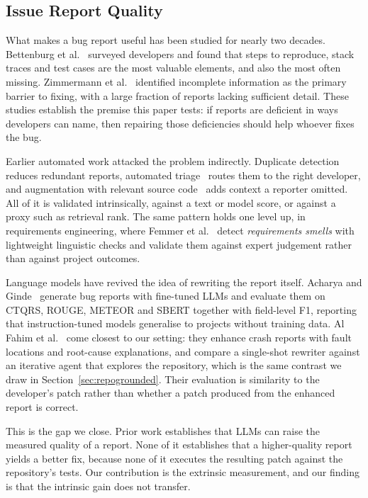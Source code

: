 \documentclass[journal]{IEEEtran}
\begin{document}
\subsection{Issue Report Quality}

What makes a bug report useful has been studied for nearly two decades. Bettenburg et
al.~\cite{bettenburg2008what} surveyed developers and found that steps to reproduce, stack
traces and test cases are the most valuable elements, and also the most often missing.
Zimmermann et al.~\cite{zimmermann2010what} identified incomplete information as the primary
barrier to fixing, with a large fraction of reports lacking sufficient detail. These studies
establish the premise this paper tests: if reports are deficient in ways developers can name,
then repairing those deficiencies should help whoever fixes the bug.

Earlier automated work attacked the problem indirectly. Duplicate detection~\cite{sun2011towards,
lazar2014generating} reduces redundant reports, automated triage~\cite{anvik2006should,
murphy2004automatic} routes them to the right developer, and augmentation with relevant source
code~\cite{wong2014autolocate, moreno2015arena} adds context a reporter omitted. All of it is
validated intrinsically, against a text or model score, or against a proxy such as retrieval
rank. The same pattern holds one level up, in requirements engineering, where Femmer et
al.~\cite{femmer2016smells} detect \emph{requirements smells} with lightweight linguistic
checks and validate them against expert judgement rather than against project outcomes.

Language models have revived the idea of rewriting the report itself. Acharya and
Ginde~\cite{acharya2025bugreport} generate bug reports with fine-tuned LLMs and evaluate them
on CTQRS, ROUGE, METEOR and SBERT together with field-level F1, reporting that instruction-tuned
models generalise to projects without training data. Al Fahim et al.~\cite{alfahim2025crash}
come closest to our setting: they enhance crash reports with fault locations and root-cause
explanations, and compare a single-shot rewriter against an iterative agent that explores the
repository, which is the same contrast we draw in Section~\ref{sec:repogrounded}. Their
evaluation is similarity to the developer's patch rather than whether a patch produced from the
enhanced report is correct.

This is the gap we close. Prior work establishes that LLMs can raise the measured quality of a
report. None of it establishes that a higher-quality report yields a better fix, because none
of it executes the resulting patch against the repository's tests. Our contribution is the
extrinsic measurement, and our finding is that the intrinsic gain does not transfer.
\end{document}
